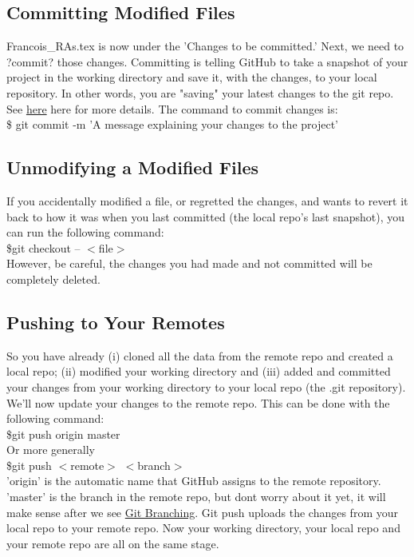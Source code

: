 \documentclass[12pt]{article}
\begin{document}
    \subsection{Committing Modified Files}
    Francois\_RAs.tex is now under the 'Changes to be committed.' Next, we need to ?commit? those changes. Committing is telling GitHub to take a snapshot of your project in the working directory and save it, with the changes, to your local repository. In other words, you are "saving" your latest changes to the git repo.
    See \href{https://git-scm.com/docs/git-commit}{here} here for more details. The command to commit changes is: \\
    \indent \$ git commit -m 'A message explaining your changes to the project'
    \subsection{Unmodifying a Modified Files}
    If you accidentally modified a file, or regretted the changes, and wants to revert it back to how it was when you last committed (the local repo's last snapshot), you can run the following command: \\
    \indent \$git checkout -- $<$file$>$ \\
    However, be careful, the changes you had made and not committed will be completely deleted.
    \subsection{Pushing to Your Remotes}
    \label{sec:pushing}
    So you have already (i) cloned all the data from the remote repo and created a local repo; (ii) modified your working directory and (iii) added and committed your changes from your working directory to your local repo (the .git repository). We'll now update your changes to the remote repo. This can be done with the following command: \\
    \indent \$git push origin master \\
    Or more generally \\
    \indent \$git push $<$remote$>$ $<$branch$>$ \\
    'origin' is the automatic name that GitHub assigns to the remote repository. 'master' is the branch in the remote repo, but don\textquotesingle t worry about it yet, it will make sense after we see \hyperref[sec:branching]{Git Branching}. Git push uploads the changes from your local repo to your remote repo. Now your working directory, your local repo and your remote repo are all on the same stage.
\end{document}
